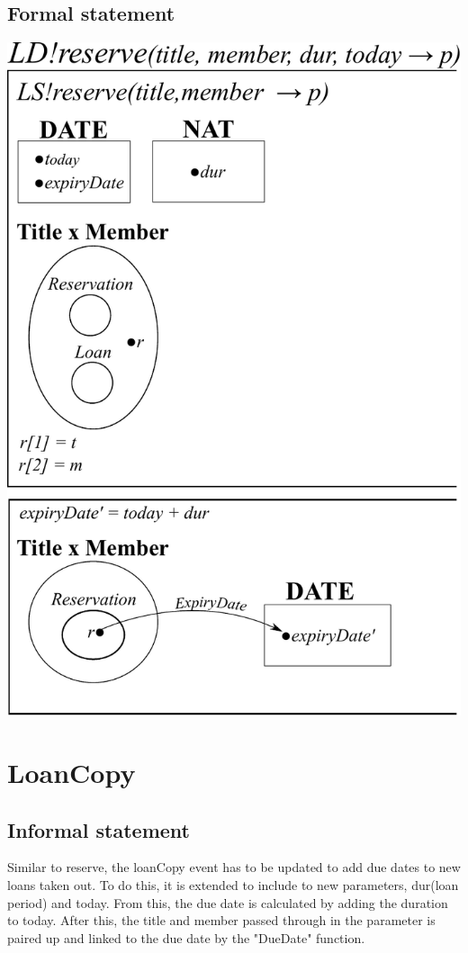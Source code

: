 \documentclass[]{report}
\begin{document}
\subsection{Formal statement}
\begin{center}
	\includegraphics[scale=0.75]{reserve.pdf}
\end{center}
\newpage
\section{LoanCopy}
\subsection{Informal statement}
Similar to reserve, the loanCopy event has to be updated to add due dates to new loans taken out. To do this, it is extended to include to new parameters, dur(loan period) and today. From this, the due date is calculated by adding the duration to today. After this, the title and member passed through in the parameter is paired up and linked to the due date by the "DueDate" function.
\end{document}
